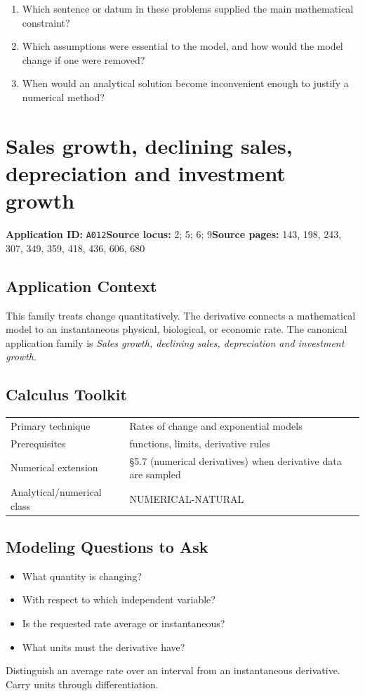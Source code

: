 \documentclass[11pt]{book}
\newcommand{\pid}[1]{\texttt{#1}}
\begin{document}
\begin{reflectionbox}\begin{enumerate}
\item Which sentence or datum in these problems supplied the main mathematical constraint?
\item Which assumptions were essential to the model, and how would the model change if one were removed?
\item When would an analytical solution become inconvenient enough to justify a numerical method?
\end{enumerate}\end{reflectionbox}
\chapter{Sales growth, declining sales, depreciation and investment growth}\label{app:A012}
\textbf{Application ID:} \pid{A012}\quad \textbf{Source locus:} 2; 5; 6; 9\quad \textbf{Source pages:} 143, 198, 243, 307, 349, 359, 418, 436, 606, 680
\section*{Application Context}
This family treats change quantitatively. The derivative connects a mathematical model to an instantaneous physical, biological, or economic rate. The canonical application family is \emph{Sales growth, declining sales, depreciation and investment growth}.
\section*{Calculus Toolkit}
\begin{tabularx}{\textwidth}{@{}lX@{}}\toprule
Primary technique & Rates of change and exponential models \\
Prerequisites & functions, limits, derivative rules \\
Numerical extension & §5.7 (numerical derivatives) when derivative data are sampled \\
Analytical/numerical class & NUMERICAL-NATURAL \\
\bottomrule\end{tabularx}
\section*{Modeling Questions to Ask}\begin{itemize}
\item What quantity is changing?
\item With respect to which independent variable?
\item Is the requested rate average or instantaneous?
\item What units must the derivative have?
\end{itemize}
\begin{errorbox}Distinguish an average rate over an interval from an instantaneous derivative. Carry units through differentiation.\end{errorbox}
\end{document}
